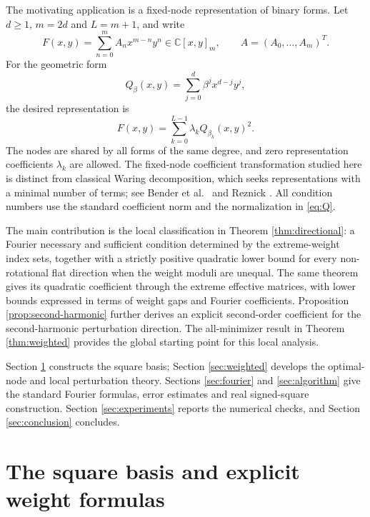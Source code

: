 \documentclass[10pt,twoside,final]{siamart1116}
\numberwithin{equation}{section}
\numberwithin{theorem}{section}
\newcommand{\C}{\mathbb C}
\begin{document}
The motivating application is a fixed-node representation of binary forms. Let
$d\ge1$, $m=2d$ and $L=m+1$, and write
\begin{equation}\label{eq:F}
F(x,y)=\sum_{n=0}^{m}A_nx^{m-n}y^n\in\C[x,y]_m,
\qquad A=(A_0,\ldots,A_m)^T.
\end{equation}
For the geometric form
\begin{equation}\label{eq:Q}
Q_\beta(x,y)=\sum_{j=0}^{d}\beta^j x^{d-j}y^j,
\end{equation}
the desired representation is
\begin{equation}\label{eq:representation}
F(x,y)=\sum_{k=0}^{L-1}\lambda_kQ_{\beta_k}(x,y)^2.
\end{equation}
The nodes are shared by all forms of the same degree, and zero representation coefficients $\lambda_k$ are allowed.
The fixed-node coefficient transformation studied here is distinct from classical
Waring decomposition, which seeks representations with a minimal number of terms; see
Bender et al.\ \cite{bender} and Reznick \cite{reznick}. All condition numbers use
the standard coefficient norm and the normalization in \eqref{eq:Q}.

The main contribution is the local classification in Theorem
\ref{thm:directional}: a Fourier necessary and sufficient condition determined by
the extreme-weight index sets, together with a strictly positive quadratic lower
bound for every non-rotational flat direction when the weight moduli are unequal.
The same theorem gives its quadratic coefficient through the extreme effective
matrices, with lower bounds expressed in terms of weight gaps and Fourier coefficients.
Proposition \ref{prop:second-harmonic} further derives an explicit second-order
coefficient for the second-harmonic perturbation direction. The all-minimizer result in Theorem \ref{thm:weighted}
provides the global starting point for this local analysis.

Section \ref{sec:basis} constructs the square basis; Section \ref{sec:weighted}
develops the optimal-node and local perturbation theory. Sections \ref{sec:fourier}
and \ref{sec:algorithm} give the standard Fourier formulas, error estimates and
real signed-square construction. Section \ref{sec:experiments} reports the
numerical checks, and Section \ref{sec:conclusion} concludes.

\section{The square basis and explicit weight formulas}\label{sec:basis}
\end{document}
